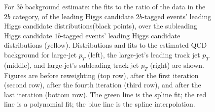 \begin{figure}[htbp!]
\begin{center}
\caption{For $3b$ background estimate: the fits to the ratio of the data in the $2b$ category, of the leading Higgs candidate $2b$-tagged events' leading Higgs candidate distributions(black points), over the subleading Higgs candidate $1b$-tagged events' leading Higgs candidate distributions (yellow). Distributions and fits to the estimated QCD background for large-\R jet $p_{T}$ (left),  the large-\R jet's leading track jet $p_T$ (middle), and large-\R jet's subleading track jet $p_T$ (right) are shown.  Figures are before reweighting (top row), after the first iteration (second row), after the fourth iteration (third row), and after the last iteration (bottom row). The green line is the spline fit; the red line is a polynomial fit; the blue line is the spline interpolation.}
\label{fig:rw-3b-subl}
\end{center}
\end{figure}

